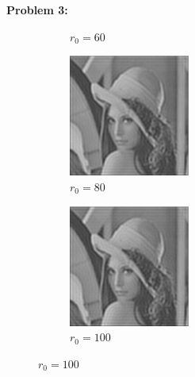 \documentclass[11pt]{article}
\newenvironment{problem}[1]{\textbf{Problem #1: }}{\newpage}
\begin{document}
\begin{problem}{3}
\begin{enumerate}[label = (\alph*)]
\begin{figure}[h!]
\begin{subfigure}{.3 \textwidth}
					\caption{$r_0 = 60$}
				\end{subfigure}
				\begin{subfigure}{.3 \textwidth}
					\centering
					\includegraphics[height = 4cm]{Figures/Prob3/p25}
					\caption{$r_0 = 80$}
				\end{subfigure}
				\begin{subfigure}{.3 \textwidth}
					\centering
					\includegraphics[height = 4cm]{Figures/Prob3/p100}
					\caption{$r_0 = 100$}
				\end{subfigure}
			\end{figure}
		\end{enumerate}
	\end{problem}
\end{document}
